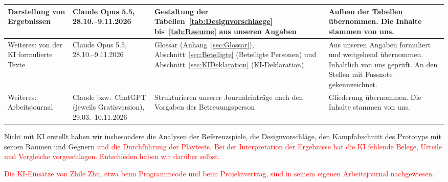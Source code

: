 \documentclass[../Main.tex]{subfiles}
\begin{document}
{\begin{longtable}{|>{\raggedright\arraybackslash}p{2.3cm}|>{\raggedright\arraybackslash}p{2.4cm}|>{\raggedright\arraybackslash}p{4.4cm}|>{\raggedright\arraybackslash}p{4.6cm}|}
        Darstellung von Ergebnissen & Claude Opus 5.5, 28.10.--9.11.2026 & Gestaltung der Tabellen~\ref{tab:Designvorschlaege} bis~\ref{tab:Raeume} aus unseren Angaben & Aufbau der Tabellen übernommen. Die Inhalte stammen von uns. \\
        \hline
        Weiteres: von der KI formulierte Texte & Claude Opus 5.5, 28.10.--9.11.2026 & Glossar (Anhang~\ref{sec:Glossar}), Abschnitt~\ref{sec:Beteiligte} (Beteiligte Personen) und Abschnitt~\ref{sec:KIDeklaration} (KI-Deklaration) & Aus unseren Angaben formuliert und weitgehend übernommen. Inhaltlich von uns geprüft. An den Stellen mit Fussnote gekennzeichnet. \\
        \hline
        Weiteres: Arbeitsjournal & Claude bzw.\ ChatGPT (jeweils Gratisversion), 29.03.--10.11.2026 & Strukturieren unserer Journaleinträge nach den Vorgaben der Betreuungsperson & Gliederung übernommen. Die Inhalte stammen von uns. \\
        \hline
    \end{longtable}
}

Nicht mit KI erstellt haben wir insbesondere die Analysen der Referenzspiele, die Designvorschläge, den Kampfabschnitt des Prototyps mit seinen Räumen und Gegnern\textcolor{red}{ und die Durchführung der Playtests. Bei der Interpretation der Ergebnisse hat die KI fehlende Belege, Urteile und Vergleiche vorgeschlagen. Entschieden haben wir darüber selbst.}

\textcolor{red}{Die KI-Einsätze von Zhile Zhu, etwa beim Programmcode und beim Projektvertrag, sind in seinem eigenen Arbeitsjournal nachgewiesen.}
\end{document}
